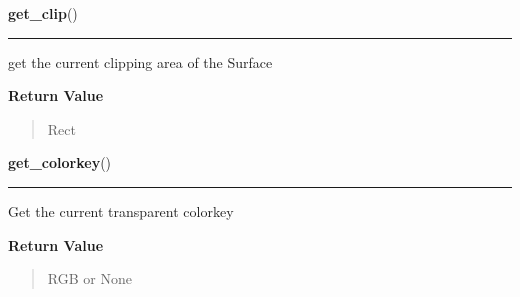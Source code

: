 \hspace{.8\funcindent}\begin{boxedminipage}{\funcwidth}

    \raggedright \textbf{get\_clip}()

    \vspace{-1.5ex}

    \rule{\textwidth}{0.5\fboxrule}
\setlength{\parskip}{2ex}
    get the current clipping area of the Surface

\setlength{\parskip}{1ex}
      \textbf{Return Value}
    \vspace{-1ex}

      \begin{quote}
      Rect

      \end{quote}

    \end{boxedminipage}

    \label{pygame:Surface:get_colorkey}

    \vspace{0.5ex}

\hspace{.8\funcindent}\begin{boxedminipage}{\funcwidth}

    \raggedright \textbf{get\_colorkey}()

    \vspace{-1.5ex}

    \rule{\textwidth}{0.5\fboxrule}
\setlength{\parskip}{2ex}
    Get the current transparent colorkey

\setlength{\parskip}{1ex}
      \textbf{Return Value}
    \vspace{-1ex}

      \begin{quote}
      RGB or None

      \end{quote}

    \end{boxedminipage}

    \label{pygame:Surface:get_flags}

    \vspace{0.5ex}


